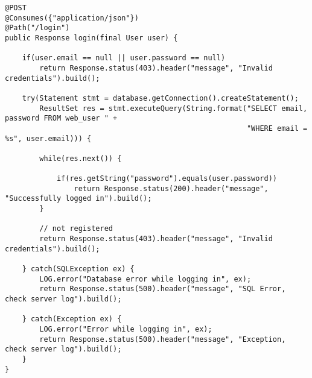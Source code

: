 \begin{lstlisting}[style=Java, caption=REST User Login]
@POST
@Consumes({"application/json"})
@Path("/login")
public Response login(final User user) {

    if(user.email == null || user.password == null)
        return Response.status(403).header("message", "Invalid credentials").build();

    try(Statement stmt = database.getConnection().createStatement();
        ResultSet res = stmt.executeQuery(String.format("SELECT email, password FROM web_user " +
                                                        "WHERE email = %s", user.email))) {

        while(res.next()) {

            if(res.getString("password").equals(user.password))
                return Response.status(200).header("message", "Successfully logged in").build();
        }

        // not registered
        return Response.status(403).header("message", "Invalid credentials").build();

    } catch(SQLException ex) {
        LOG.error("Database error while logging in", ex);
        return Response.status(500).header("message", "SQL Error, check server log").build();

    } catch(Exception ex) {
        LOG.error("Error while logging in", ex);
        return Response.status(500).header("message", "Exception, check server log").build();
    }
}
\end{lstlisting}



